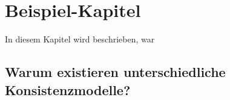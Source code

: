 \chapter{Beispiel-Kapitel}

In diesem Kapitel wird beschrieben, war

\section{Warum existieren unterschiedliche Konsistenzmodelle?}
